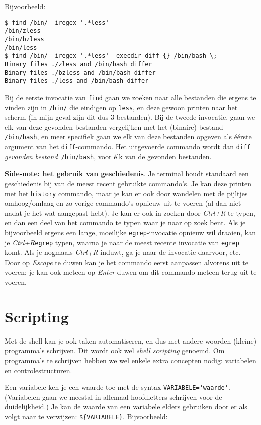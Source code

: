 \documentclass[a4paper,twoside,openany]{memoir}
\begin{document}
Bijvoorbeeld:
\begin{verbatim}
$ find /bin/ -iregex '.*less'
/bin/zless
/bin/bzless
/bin/less
$ find /bin/ -iregex '.*less' -execdir diff {} /bin/bash \;
Binary files ./zless and /bin/bash differ
Binary files ./bzless and /bin/bash differ
Binary files ./less and /bin/bash differ
\end{verbatim}
Bij de eerste invocatie van \verb!find! gaan we zoeken naar alle bestanden die
ergens te vinden zijn in \verb!/bin/! die eindigen op \verb!less!, en deze
gewoon printen naar het scherm (in mijn geval zijn dit dus 3 bestanden). Bij de
tweede invocatie, gaan we elk van deze gevonden bestanden vergelijken met het
(binaire) bestand \verb!/bin/bash!, en meer specifiek gaan we elk van deze
bestanden opgeven als éérste argument van het \verb!diff!-commando. Het
uitgevoerde commando wordt dan \verb!diff !\emph{gevonden bestand}\verb! /bin/bash!,
voor élk van de gevonden bestanden.

\textbf{Side-note: het gebruik van geschiedenis}. Je terminal houdt standaard
een geschiedenis bij van de meest recent gebruikte commando's. Je kan deze
printen met het \verb!history! commando, maar je kan er ook door wandelen met
de pijltjes omhoog/omlaag en zo vorige commando's opnieuw uit te voeren (al dan
niet nadat je het wat aangepast hebt). Je kan er ook in zoeken door
\emph{Ctrl+R} te typen, en dan een deel van het commando te typen waar je naar
op zoek bent. Als je bijvoorbeeld ergens een lange, moeilijke
\verb!egrep!-invocatie opnieuw wil draaien, kan je \emph{Ctrl+R}\verb!egrep!
typen, waarna je naar de meest recente invocatie van \verb!egrep! komt. Als je
nogmaals \emph{Ctrl+R} induwt, ga je naar de invocatie daarvoor, etc. Door op
\emph{Escape} te duwen kan je het commando eerst aanpassen alvorens uit te
voeren; je kan ook meteen op \emph{Enter} duwen om dit commando meteen terug
uit te voeren.

\chapter{Scripting}

Met de shell kan je ook taken automatiseren, en dus met andere woorden (kleine)
programma's schrijven. Dit wordt ook wel \emph{shell scripting} genoemd. Om
programma's te schrijven hebben we wel enkele extra concepten nodig: variabelen
en controlestructuren.

Een variabele ken je een waarde toe met de syntax \verb!VARIABELE='waarde'!.
(Variabelen gaan we meestal in allemaal hoofdletters schrijven voor de
duidelijkheid.) Je kan de waarde van een variabele elders gebruiken door er als
volgt naar te verwijzen: \verb!${VARIABELE}!. Bijvoorbeeld:
\end{document}
